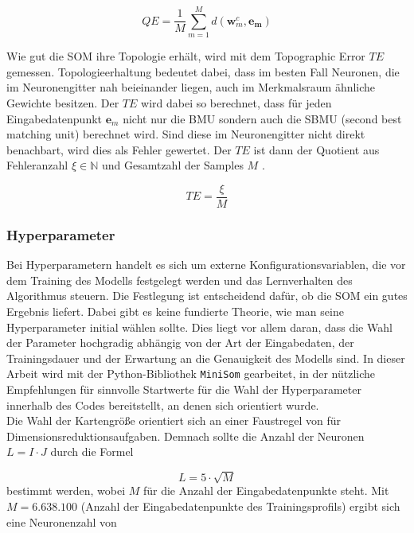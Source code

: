 \begin{equation}
    QE = \frac{1}{M} \sum_{m=1}^{M} d(\mathbf{w}_{m}^c, \mathbf{e_m})
\end{equation}

\noindent Wie gut die SOM ihre Topologie erhält, wird mit dem Topographic Error $TE$ gemessen. Topologieerhaltung bedeutet dabei, dass im besten Fall Neuronen, die im Neuronengitter nah beieinander liegen, auch im Merkmalsraum ähnliche Gewichte besitzen. Der $TE$ wird dabei so berechnet, dass für jeden Eingabedatenpunkt $\mathbf{e}_m$ nicht nur die BMU sondern auch die SBMU (second best matching unit) berechnet wird. Sind diese im Neuronengitter nicht direkt benachbart, wird dies als Fehler gewertet. Der $TE$ ist dann der Quotient aus Fehleranzahl $\xi \in \mathbb{N}$ und Gesamtzahl der Samples $M$ \parencite{vettigli_minisom_2021}.

\begin{equation}
    TE = \frac{\xi}{M}
\end{equation}

\subsubsection{Hyperparameter}

Bei Hyperparametern handelt es sich um externe Konfigurationsvariablen, die vor dem Training des Modells festgelegt werden und das Lernverhalten des Algorithmus steuern. Die Festlegung ist entscheidend dafür, ob die SOM ein gutes Ergebnis liefert. Dabei gibt es keine fundierte Theorie, wie man seine Hyperparameter initial wählen sollte. Dies liegt vor allem daran, dass die Wahl der Parameter hochgradig abhängig von der Art der Eingabedaten, der Trainingsdauer und der Erwartung an die Genauigkeit des Modells sind. In dieser Arbeit wird mit der Python-Bibliothek \texttt{MiniSom} gearbeitet, in der \textcite{vettigli_minisom_2021} nützliche Empfehlungen für sinnvolle Startwerte für die Wahl der Hyperparameter innerhalb des Codes bereitstellt, an denen sich orientiert wurde. \\
Die Wahl der Kartengröße orientiert sich an einer Faustregel von \textcite{vettigli_minisom_2021} für Dimensionsreduktionsaufgaben. Demnach sollte die Anzahl der Neuronen $L = I \cdot J$ durch die Formel

\begin{equation}
    L = 5 \cdot \sqrt{M}
\end{equation}
bestimmt werden, wobei $M$ für die Anzahl der Eingabedatenpunkte steht. Mit $M = 6.638.100$ (Anzahl der Eingabedatenpunkte des Trainingsprofils) ergibt sich eine Neuronenzahl von

